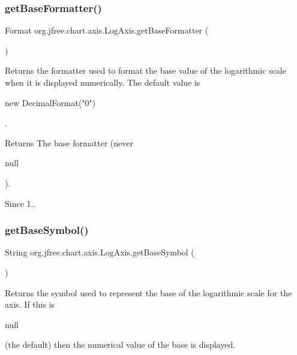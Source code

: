 \subsubsection{\texorpdfstring{get\+Base\+Formatter()}{getBaseFormatter()}}
{\footnotesize\ttfamily Format org.\+jfree.\+chart.\+axis.\+Log\+Axis.\+get\+Base\+Formatter (\begin{DoxyParamCaption}{ }\end{DoxyParamCaption})}

Returns the formatter used to format the base value of the logarithmic scale when it is displayed numerically. The default value is 
\begin{DoxyCode}
\textcolor{keyword}{new} DecimalFormat(\textcolor{stringliteral}{"0"}) 
\end{DoxyCode}
 .

\begin{DoxyReturn}{Returns}
The base formatter (never
\begin{DoxyCode}
null 
\end{DoxyCode}
 ).
\end{DoxyReturn}
\begin{DoxySince}{Since}
1.. 
\end{DoxySince}
\mbox{\label{classorg_1_1jfree_1_1chart_1_1axis_1_1_log_axis_acb1c8149c1ac4cf046ff8088598c2214}} 
\subsubsection{\texorpdfstring{get\+Base\+Symbol()}{getBaseSymbol()}}
{\footnotesize\ttfamily String org.\+jfree.\+chart.\+axis.\+Log\+Axis.\+get\+Base\+Symbol (\begin{DoxyParamCaption}{ }\end{DoxyParamCaption})}

Returns the symbol used to represent the base of the logarithmic scale for the axis. If this is
\begin{DoxyCode}
null 
\end{DoxyCode}
 (the default) then the numerical value of the base is displayed.

